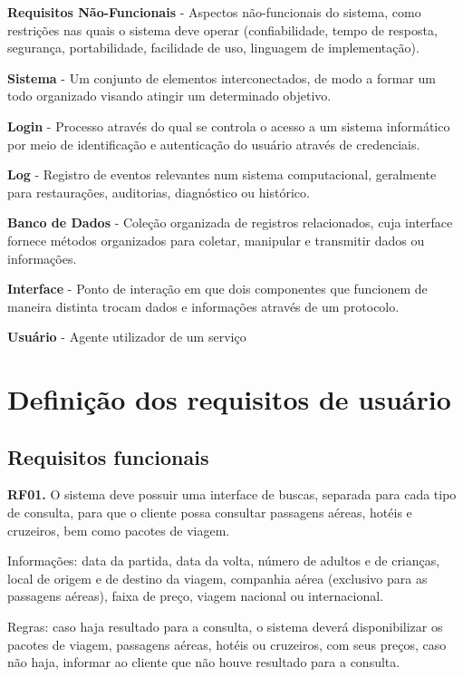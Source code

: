\documentclass[12pt]{article}
\begin{document}
{\bf Requisitos Não-Funcionais} - Aspectos não-funcionais do sistema, como restrições nas quais o sistema deve operar (confiabilidade, tempo de resposta, segurança, portabilidade, facilidade de uso, linguagem de implementação).

{\bf Sistema} - Um conjunto de elementos interconectados, de modo a formar um todo organizado visando atingir um determinado objetivo.

{\bf Login} - Processo através do qual se controla o acesso a um sistema informático por meio de identificação e autenticação do usuário através de credenciais.

{\bf Log} -  Registro de eventos relevantes num sistema computacional, geralmente para restaurações, auditorias, diagnóstico ou histórico.

{\bf Banco de Dados} - Coleção organizada de registros relacionados, cuja interface fornece métodos organizados para coletar, manipular e transmitir dados ou informações.

{\bf Interface} - Ponto de interação em que dois componentes que funcionem de maneira distinta trocam dados e informações através de um protocolo.

{\bf Usuário} - Agente utilizador de um serviço

\clearpage
\section{Definição dos requisitos de usuário}
\label{sec:req_usuario}
\subsection{Requisitos funcionais}

{\bf RF01.} O sistema deve possuir uma interface de buscas, separada para cada tipo de consulta, para que o cliente possa consultar passagens aéreas, hotéis e cruzeiros, bem como pacotes de viagem.

Informações: data da partida, data da volta, número de adultos e de crianças, local de origem e de destino da viagem, companhia aérea (exclusivo para as passagens aéreas), faixa de preço, viagem nacional ou internacional.

Regras: caso haja resultado para a consulta, o sistema deverá disponibilizar os pacotes de viagem, passagens aéreas, hotéis ou cruzeiros, com seus preços, caso não haja, informar ao cliente que não houve resultado para a consulta.
\end{document}
